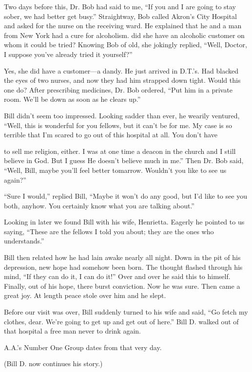 \begin{biblechapter}
Two days before this, Dr. Bob had said to me, “If you and I are going to stay sober, we had better get busy.” Straightway, Bob called Akron’s City Hospital and asked for the nurse on the receiving ward. He explained that he and a man from New York had a cure for alcoholism. did she have an alcoholic customer on whom it could be tried? Knowing Bob of old, she jokingly replied, “Well, Doctor, I suppose you’ve already tried it yourself?”

Yes, she did have a customer—a dandy. He just arrived in D.T.’s. Had blacked the eyes of two nurses, and now they had him strapped down tight. Would this one do? After prescribing medicines, Dr. Bob ordered, “Put him in a private room. We’ll be down as soon as he clears up.”

Bill didn’t seem too impressed. Looking sadder than ever, he wearily ventured, “Well, this is wonderful for you fellows, but it can’t be for me. My case is so terrible that I’m scared to go out of this hospital at all. You don’t have

to sell me religion, either. I was at one time a deacon in the church and I still believe in God. But I guess He doesn’t believe much in me.”
Then Dr. Bob said, “Well, Bill, maybe you’ll feel better tomarrow. Wouldn’t you like to see us again?”

“Sure I would,” replied Bill, “Maybe it won’t do any good, but I’d like to see you both, anyhow. You certainly know what you are talking about.”

Looking in later we found Bill with his wife, Henrietta. Eagerly he pointed to us saying, “These are the fellows I told you about; they are the ones who understands.”

Bill then related how he had lain awake nearly all night. Down in the pit of his depression, new hope had somehow been born. The thought flashed through his mind, “If they can do it, I can do it!”  Over and over he said this to himself. Finally, out of his hope, there burst conviction. Now he was sure. Then came a great joy. At length peace stole over him and he slept.

Before our visit was over, Bill suddenly turned to his wife and said, “Go fetch my clothes, dear. We’re going to get up and get out of here.”  Bill D. walked out of that hospital a free man never to drink again.

A.A.’s Number One Group dates from that very day.

(Bill D. now continues his story.)


\end{biblechapter}
